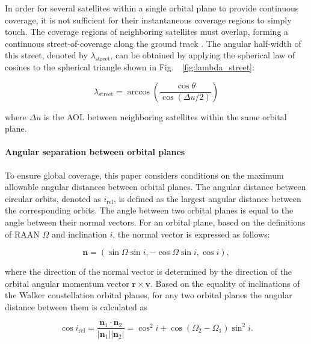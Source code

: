 In order for several satellites within a single orbital plane to provide continuous coverage, 
it is not sufficient for their instantaneous coverage regions to simply touch. The coverage regions 
of neighboring satellites must overlap, forming a continuous street-of-coverage along the ground track \cite{ulybyshev2014, wertz2001ocdm}. 
The angular half-width of this street, denoted by $\lambda_{\mathrm{street}}$, can be obtained by applying 
the spherical law of cosines to the spherical triangle shown in Fig.~~\ref{fig:lambda_street}:

\begin{equation}
\lambda_{\mathrm{street}} = \arccos\left(\frac{\cos\theta}{\cos\left(\Delta u/2\right)}\right)
\end{equation}

where $\Delta u$ is the AOL between neighboring satellites within the same orbital plane. 

\paragraph{Angular separation between orbital planes}

To ensure global coverage, this paper considers conditions on the maximum allowable angular 
distances between orbital planes. The angular distance between circular orbits, denoted 
as $i_{\mathrm{rel}}$, is defined as the largest angular distance between the corresponding orbits.
The angle between two orbital planes is equal to the angle between their normal vectors. 
For an orbital plane, based on the definitions of RAAN $\Omega$ and inclination $i$, the normal vector 
is expressed as follows:

\begin{equation}
\mathbf{n}=
\left(
\sin\Omega\sin i,
-\cos\Omega\sin i,
\cos i
\right),
\end{equation}

where the direction of the normal vector is determined by the direction of the orbital 
angular momentum vector $\mathbf{r}\times\mathbf{v}$.
Based on the equality of inclinations of the Walker constellation orbital planes, 
for any two orbital planes the angular distance between them is calculated as

\begin{equation}
\cos i_{\mathrm{rel}}=\frac{\mathbf{n}_1\cdot\mathbf{n}_2}{|\mathbf{n}_1||\mathbf{n}_2|}=\cos^2 i+\cos(\Omega_2-\Omega_1)\sin^2 i.
\end{equation}

